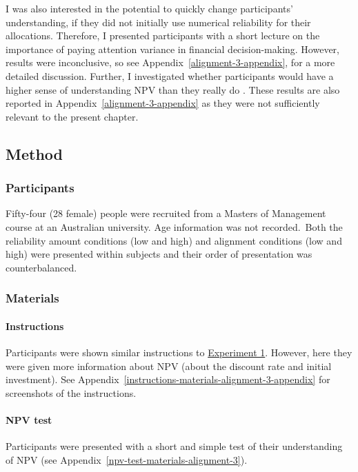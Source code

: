 \documentclass[a4paper, nobind, dvipsnames]{templates/ociamthesis}
\theoremstyle{definition}
\theoremstyle{definition}
\theoremstyle{definition}
\theoremstyle{definition}
\theoremstyle{remark}
\begin{document}
I was also interested in the potential to quickly change participants'
understanding, if they did not initially use numerical reliability for their
allocations. Therefore, I presented participants with a short lecture on the
importance of paying attention variance in financial decision-making. However,
results were inconclusive, so see Appendix~\ref{alignment-3-appendix}, for a
more detailed discussion. Further, I investigated whether participants would
have a higher sense of understanding NPV than they really do \autocite[as in][]{long2018}.
These results are also reported in Appendix~\ref{alignment-3-appendix} as they
were not sufficiently relevant to the present chapter.

\subsection{Method}

\subsubsection{Participants}

Fifty-four (28 female) people were recruited from a Masters of Management course at an Australian university. Age information was not recorded.~Both the reliability amount conditions (low and
high) and alignment conditions (low and high) were presented within subjects and
their order of presentation was counterbalanced.

\subsubsection{Materials}

\paragraph{Instructions}

Participants were shown similar instructions to \protect\hyperlink{instructions-materials-alignment-2}{Experiment
1}. However, here they were given more
information about NPV (about the discount rate and initial investment). See
Appendix~\ref{instructions-materials-alignment-3-appendix} for screenshots of
the instructions.

\paragraph{NPV test}

Participants were presented with a short and simple test of their understanding
of NPV (see Appendix~\ref{npv-test-materials-alignment-3}).
\end{document}

